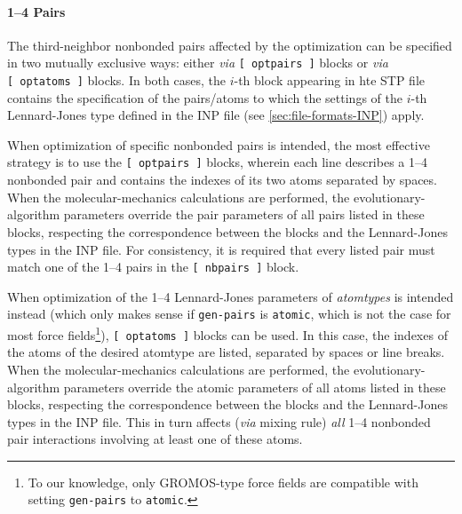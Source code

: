 \documentclass[10pt,a4paper,openany]{memoir}
\numberwithin{equation}{section}
\begin{document}

\paragraph{1--4 Pairs}

The third-neighbor nonbonded pairs affected by the optimization can be
specified in two mutually exclusive ways: either \textit{via}
\texttt{[~optpairs~]} blocks or \textit{via} \texttt{[~optatoms~]}
blocks. In both cases, the $i$-th block appearing in hte STP file
contains the specification of the pairs/atoms to which the settings of
the $i$-th Lennard-Jones type defined in the INP file (see
\autoref{sec:file-formats-INP}) apply.

When optimization of specific nonbonded pairs is intended, the most
effective strategy is to use the \texttt{[~optpairs~]} blocks, wherein
each line describes a 1--4 nonbonded pair and contains the indexes of
its two atoms separated by spaces.  When the molecular-mechanics
calculations are performed, the evolutionary-algorithm parameters
override the pair parameters of all pairs listed in these blocks,
respecting the correspondence between the blocks and the Lennard-Jones
types in the INP file.  For consistency, it is required that every
listed pair must match one of the 1--4 pairs in the
\texttt{[~nbpairs~]} block.

When optimization of the 1--4 Lennard-Jones parameters of
\textit{atomtypes} is intended instead (which only makes sense if
\texttt{gen-pairs} is \texttt{atomic}, which is not the case for most
force fields\footnote{To our knowledge, only GROMOS-type force fields
  are compatible with setting \texttt{gen-pairs} to
  \texttt{atomic}.}), \texttt{[~optatoms~]} blocks can be used.  In
this case, the indexes of the atoms of the desired atomtype are
listed, separated by spaces or line breaks.  When the
molecular-mechanics calculations are performed, the
evolutionary-algorithm parameters override the atomic parameters of
all atoms listed in these blocks, respecting the correspondence
between the blocks and the Lennard-Jones types in the INP file.  This
in turn affects (\textit{via} mixing rule) \textit{all} 1--4 nonbonded
pair interactions involving at least one of these atoms.
\end{document}
